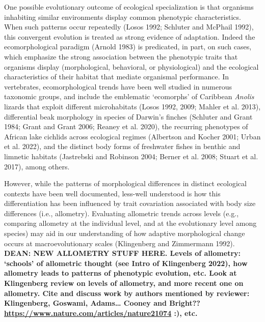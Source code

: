 \documentclass[
  11pt,
]{article}
\begin{document}
One possible evolutionary outcome of ecological specialization is that
organisms inhabiting similar environments display common phenotypic
characteristics. When such patterns occur repeatedly (Losos 1992;
Schluter and McPhail 1992), this convergent evolution is treated as
strong evidence of adaptation. Indeed the ecomorphological paradigm
(Arnold 1983) is predicated, in part, on such cases, which emphasize the
strong association between the phenotypic traits that organisms display
(morphological, behavioral, or physiological) and the ecological
characteristics of their habitat that mediate organismal performance. In
vertebrates, ecomorphological trends have been well studied in numerous
taxonomic groups, and include the emblematic `ecomorphs' of Caribbean
\emph{Anolis} lizards that exploit different microhabitats (Losos 1992,
2009; Mahler et al. 2013), differential beak morphology in species of
Darwin's finches (Schluter and Grant 1984; Grant and Grant 2006; Reaney
et al. 2020), the recurring phenotypes of African lake cichlids across
ecological regimes (Albertson and Kocher 2001; Urban et al. 2022), and
the distinct body forms of freshwater fishes in benthic and limnetic
habitats (Jastrebski and Robinson 2004; Berner et al. 2008; Stuart et
al. 2017), among others. \hfill\break

However, while the patterns of morphological differences in distinct
ecological contexts have been well documented, less-well understood is
how this differentiation has been influenced by trait covariation
associated with body size differences (i.e., allometry). Evaluating
allometric trends across levels (e.g., comparing allometry at the
individual level, and at the evolutionary level among species) may aid
in our understanding of how adaptive morphological change occurs at
macroevolutionary scales (Klingenberg and Zimmermann 1992).
\textbf{DEAN: NEW ALLOMETRY STUFF HERE. Levels of allometry: `schools'
of allometric thought (see Intro of Klingenberg 2022), how allometry
leads to patterns of phenotypic evolution, etc. Look at Klingenberg
review on levels of allometry, and more recent one on allometry. Cite
and discuss work by authors mentioned by reviewer: Klingenberg, Goswami,
Adams\ldots{} Cooney and Bright??
\url{https://www.nature.com/articles/nature21074} :), etc. }
\hfill\break
\end{document}
